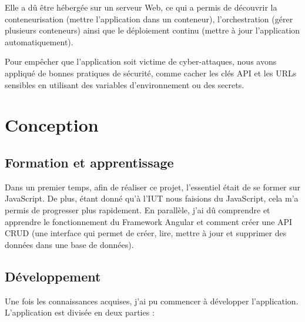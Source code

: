 Elle a dû être hébergée sur un serveur Web, ce qui a permis de découvrir la conteneurisation (mettre l'application dans un conteneur), l’orchestration (gérer plusieurs conteneurs) ainsi que le déploiement continu (mettre à jour l'application automatiquement).

Pour empêcher que l'application soit victime de cyber-attaques, nous avons appliqué de bonnes pratiques de sécurité, comme cacher les clés API et les URLs sensibles en utilisant des variables d'environnement ou des secrets.

\section{Conception}

\subsection{Formation et apprentissage}

Dans un premier temps, afin de réaliser ce projet, l’essentiel était de se former sur JavaScript.
De plus, étant donné qu’à l’IUT nous faisions du JavaScript, cela m’a permis de progresser plus rapidement.
En parallèle, j’ai dû comprendre et apprendre le fonctionnement du Framework Angular et comment créer une API CRUD (une interface qui permet de créer, lire, mettre à jour et supprimer des données dans une base de données).

\subsection{Développement}

Une fois les connaissances acquises, j’ai pu commencer à développer l’application. L’application est divisée en deux parties :

